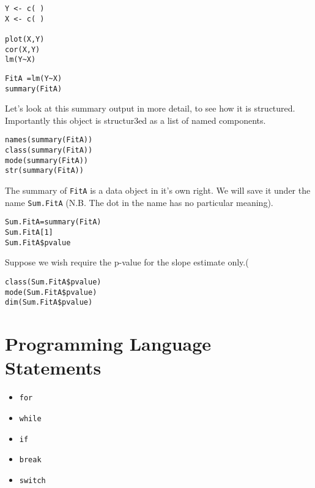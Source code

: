 \documentclass[12pt]{article} %
\begin{document}
\begin{framed}
\begin{verbatim}
Y <- c( )
X <- c( )

plot(X,Y)
cor(X,Y)
lm(Y~X)
\end{verbatim}
\end{framed}
\begin{framed}
\begin{verbatim}
FitA =lm(Y~X)
summary(FitA)
\end{verbatim}
\end{framed}
Let's look at this summary output in more detail, to see how it is structured. Importantly this object is structur3ed as a list of named components.
\begin{framed}
\begin{verbatim}
names(summary(FitA))
class(summary(FitA))
mode(summary(FitA))
str(summary(FitA))
\end{verbatim}
\end{framed}

The summary of \texttt{FitA} is a data object in it's own right. We will save it under the name \texttt{Sum.FitA} (N.B. The dot in the name has no particular meaning).
\begin{framed}
\begin{verbatim}
Sum.FitA=summary(FitA)
Sum.FitA[1]
Sum.FitA$pvalue
\end{verbatim}
\end{framed}
Suppose we wish require the p-value for the slope estimate only.(
\begin{framed}
\begin{verbatim}
class(Sum.FitA$pvalue)
mode(Sum.FitA$pvalue)
dim(Sum.FitA$pvalue)
\end{verbatim}
\end{framed}

\section{Programming Language Statements}

\begin{itemize}
\item \texttt{for}
\item \texttt{while}
\item \texttt{if}
\item \texttt{break}
\item \texttt{switch}
\end{itemize}
\end{document}

